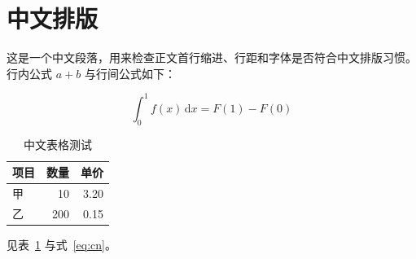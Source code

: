 \documentclass[UTF8]{ctexart}
\begin{document}
\section{中文排版}

这是一个中文段落，用来检查正文首行缩进、行距和字体是否符合中文排版习惯。
行内公式 $a+b$ 与行间公式如下：

\begin{equation}
\int_{0}^{1} f(x)\,\mathrm{d}x = F(1) - F(0)
\label{eq:cn}
\end{equation}

\begin{table}[htbp]
\centering
\caption{中文表格测试}
\label{tab:cn}
\begin{tabular}{lrr}
\hline
项目 & 数量 & 单价 \\
\hline
甲 & 10 & 3.20 \\
乙 & 200 & 0.15 \\
\hline
\end{tabular}
\end{table}

见表~\ref{tab:cn} 与式~\eqref{eq:cn}。
\end{document}
